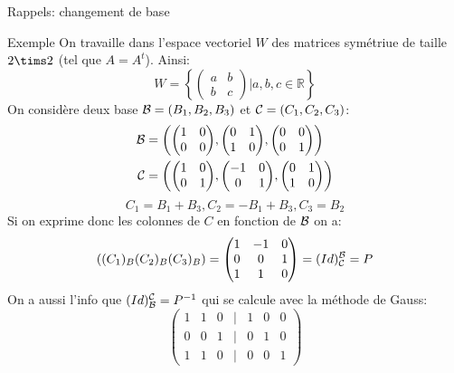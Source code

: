 \begin{parag}{Rappels: changement de base}
    \begin{subparag}{Exemple}
        On travaille dans l'espace vectoriel $W$ des matrices symétriue de taille $2 \tims 2$ (tel que $A = A^t$). Ainsi:
        \[W = \left\{ \begin{pmatrix}
            a & b \\ b & c
        \end{pmatrix}| a, b, c \in \mathbb{R} \right\}\]
        On considère deux base $\mathcal{B} = (B_1, B_2, B_3)$ et $\mathcal{C} = (C_1, C_2, C_3)$:
        \begin{align*}
            \bmath &= \left(\begin{pmatrix}
                1 & 0 \\ 0 & 0
            \end{pmatrix}, \begin{pmatrix}
                0 & 1 \\ 1 & 0
            \end{pmatrix}, \begin{pmatrix}
                0 & 0 \\ 0 & 1
            \end{pmatrix}\textbf{}\right) \\
            \cmath &= \left(\begin{pmatrix}
                1 & 0 \\0 & 1
            \end{pmatrix}, \begin{pmatrix}
                -1 & 0 \\ 0 & 1
            \end{pmatrix}, \begin{pmatrix}
                0 & 1 \\ 1 & 0
            \end{pmatrix}\right)
        \end{align*}
        \[C_1 = B_1 + B_3, C_2 = -B_1 +B_3 , C_3 = B_2 \]
        Si on exprime donc les colonnes de $C$ en fonction de $\mathcal{B}$ on a:
        \[\left((C_1)_B (C_2)_B (C_3)_B \right) = \begin{pmatrix}
            1 & -1 & 0 \\
            0 & 0 & 1\\
            1 & 1 & 0
        \end{pmatrix} = (Id)_\cmath^\bmath = P\]
        On a aussi l'info que $(Id)_{\mathcal{B}}^{\mathcal{C}} = P^{-1}$ qui se calcule avec la méthode de Gauss:
        \[\begin{pmatrix}
            1 & 1 & 0 & | & 1  & 0 & 0\\
            0 & 0 & 1 & | & 0 & 1 & 0 \\
            1 & 1 & 0 & | & 0 & 0 & 1
        \end{pmatrix}\]
    
    \end{subparag}
\end{parag}



